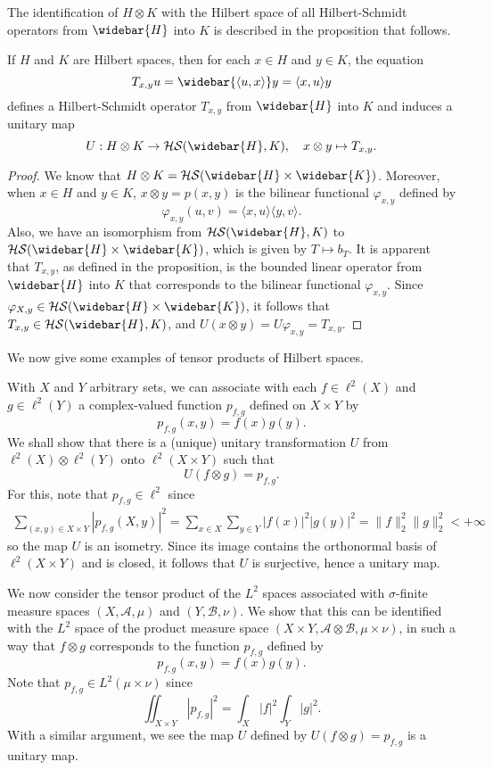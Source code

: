 The identification of $H\otimes K$ with the Hilbert space of all Hilbert-Schmidt operators from $\widebar{H}$ into $K$ is described in the proposition that follows.
\begin{proposition}\label{Hilbert space tensor product is HS-operator}
If $H$ and $K$ are Hilbert spaces, then for each $x\in H$ and $y\in K$, the equation
\[T_{x,y}u=\widebar{\langle u,x\rangle}y=\langle x,u\rangle y\]
defines a Hilbert-Schmidt operator $T_{x,y}$ from $\widebar{H}$ into $K$ and induces a unitary map
\[U:H\otimes K\to\mathcal{HS}(\widebar{H},K),\quad x\otimes y\mapsto T_{x,y}.\]
\end{proposition}
\begin{proof}
We know that $H\otimes K=\mathcal{HS}(\widebar{H}\times\widebar{K})$. Moreover, when $x\in H$ and $y\in K$, $x\otimes y=p(x,y)$ is the bilinear functional $\varphi_{x,y}$ defined by
\[\varphi_{x,y}(u,v)=\langle x,u\rangle\langle y,v\rangle.\]
Also, we have an isomorphism from $\mathcal{HS}(\widebar{H},K)$ to $\mathcal{HS}(\widebar{H}\times\widebar{K})$, which is given by $T\mapsto b_T$. It is apparent that $T_{x,y}$, as defined in the proposition, is the bounded linear operator from $\widebar{H}$ into $K$ that corresponds to the bilinear functional $\varphi_{x,y}$. Since $\varphi_{X,y}\in\mathcal{HS}(\widebar{H}\times\widebar{K})$, it follows that $T_{x,y}\in\mathcal{HS}(\widebar{H},K)$, and $U(x\otimes y)=U\varphi_{x,y}=T_{x,y}$.
\end{proof}
We now give some examples of tensor products of Hilbert spaces.
\begin{example}
With $X$ and $Y$ arbitrary sets, we can associate with each $f\in\ell^2(X)$ and $g\in\ell^2(Y)$ a complex-valued function $p_{f,g}$ defined on $X\times Y$ by
\[p_{f,g}(x,y)=f(x)g(y).\]
We shall show that there is a (unique) unitary transformation $U$ from $\ell^2(X)\otimes\ell^2(Y)$ onto $\ell^2(X\times Y)$ such that
\[U(f\otimes g)=p_{f,g}.\]
For this, note that $p_{f,g}\in\ell^2$ since
\begin{align*}
\sum_{(x,y)\in X\times Y}|p_{f,g}(X,y)|^2=\sum_{x\in X}\sum_{y\in Y}|f(x)|^2|g(y)|^2=\|f\|_2^2\|g\|_2^2<+\infty
\end{align*}
so the map $U$ is an isometry. Since its image contains the orthonormal basis of $\ell^2(X\times Y)$ and is closed, it follows that $U$ is surjective, hence a unitary map.
\end{example}
\begin{example}
We now consider the tensor product of the $L^2$ spaces associated with $\sigma$-finite measure spaces $(X,\mathcal{A},\mu)$ and $(Y,\mathcal{B},\nu)$. We show that this can be identified with the $L^2$ space of the product measure space $(X\times Y,\mathcal{A}\otimes\mathcal{B},\mu\times\nu)$, in such a way that $f\otimes g$ corresponds to the function $p_{f,g}$ defined by
\[p_{f,g}(x,y)=f(x)g(y).\]
Note that $p_{f,g}\in L^2(\mu\times\nu)$ since
\[\iint_{X\times Y}|p_{f,g}|^2=\int_X|f|^2\int_Y|g|^2.\]
With a similar argument, we see the map $U$ defined by $U(f\otimes g)=p_{f,g}$ is a unitary map.
\end{example}
